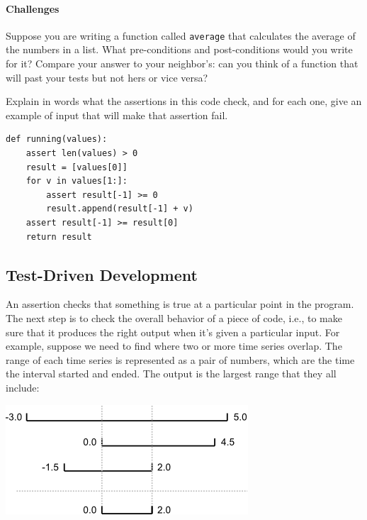 \documentclass{book}
\begin{document}
\mbox{}\paragraph{Challenges}

\begin{swcenumerate}
\item
  Suppose you are writing a function called \texttt{average} that
  calculates the average of the numbers in a list. What pre-conditions
  and post-conditions would you write for it? Compare your answer to
  your neighbor's: can you think of a function that will past your tests
  but not hers or vice versa?
\item
  Explain in words what the assertions in this code check, and for each
  one, give an example of input that will make that assertion fail.

\begin{verbatim}
def running(values):
    assert len(values) > 0
    result = [values[0]]
    for v in values[1:]:
        assert result[-1] >= 0
        result.append(result[-1] + v)
    assert result[-1] >= result[0]
    return result
\end{verbatim}
\end{swcenumerate}

\subsection{Test-Driven Development}

An assertion checks that something is true at a particular point in the
program. The next step is to check the overall behavior of a piece of
code, i.e., to make sure that it produces the right output when it's
given a particular input. For example, suppose we need to find where two
or more time series overlap. The range of each time series is
represented as a pair of numbers, which are the time the interval
started and ended. The output is the largest range that they all
include:

\includegraphics{novice/python/img/python-overlapping-ranges.png}
\end{document}
